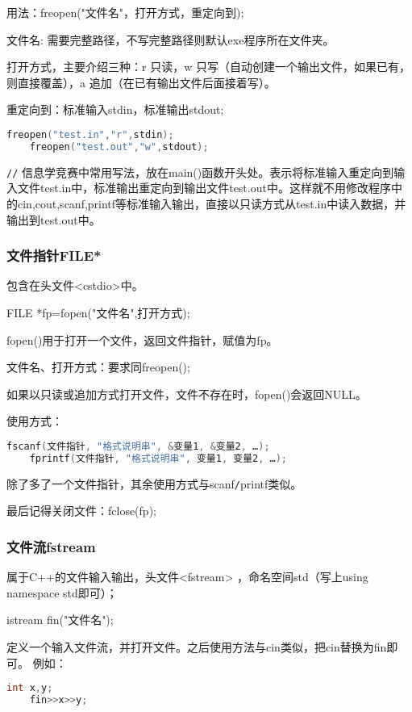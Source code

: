 \documentclass[UTF8]{ctexart}
\begin{document}
用法：freopen("文件名"，打开方式，重定向到);

文件名: 需要完整路径，不写完整路径则默认exe程序所在文件夹。

打开方式，主要介绍三种：r 只读，w 只写（自动创建一个输出文件，如果已有，则直接覆盖），a 追加（在已有输出文件后面接着写）。

重定向到：标准输入stdin，标准输出stdout;
\begin{lstlisting}[language = C,basicstyle=\small\ttfamily]
    freopen("test.in","r",stdin);
    freopen("test.out","w",stdout);
\end{lstlisting}
\verb|//| 信息学竞赛中常用写法，放在main()函数开头处。表示将标准输入重定向到输入文件test.in中，标准输出重定向到输出文件test.out中。这样就不用修改程序中的cin,cout,scanf,printf等标准输入输出，直接以只读方式从test.in中读入数据，并输出到test.out中。

\subsubsection{文件指针FILE*}
包含在头文件<cstdio>中。

FILE *fp=fopen("文件名",打开方式);

fopen()用于打开一个文件，返回文件指针，赋值为fp。

文件名、打开方式：要求同freopen();

如果以只读或追加方式打开文件，文件不存在时，fopen()会返回NULL。

使用方式：
\begin{lstlisting}[language = C,basicstyle=\small\ttfamily]
    fscanf(文件指针, "格式说明串", &变量1, &变量2, …);
    fprintf(文件指针, "格式说明串", 变量1, 变量2, …);
\end{lstlisting}
除了多了一个文件指针，其余使用方式与scanf\verb|/|printf类似。

最后记得关闭文件：fclose(fp);

\subsubsection{文件流fstream}
属于C++的文件输入输出，头文件<fstream> ，命名空间std（写上using namespace std即可）；

istream fin("文件名");

定义一个输入文件流，并打开文件。之后使用方法与cin类似，把cin替换为fin即可。
例如：
\begin{lstlisting}[language = C,basicstyle=\small\ttfamily]
    int x,y;
    fin>>x>>y;
\end{lstlisting}
\end{document}
